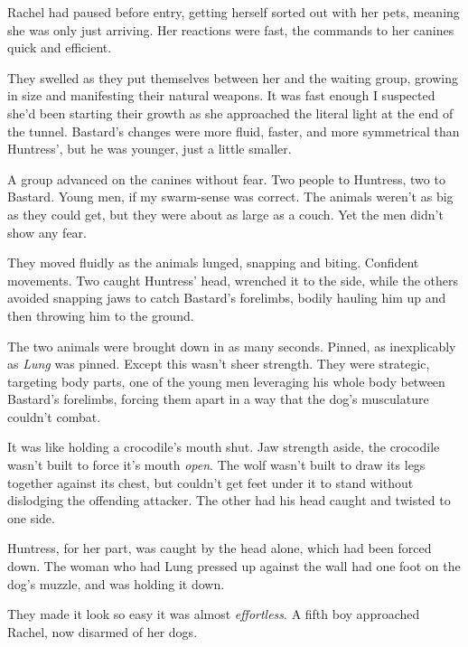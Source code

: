 Rachel had paused before entry, getting herself sorted out with her pets, meaning she was only just arriving.  Her reactions were fast, the commands to her canines quick and efficient.



They swelled as they put themselves between her and the waiting group, growing in size and manifesting their natural weapons.  It was fast enough I suspected she'd been starting their growth as she approached the literal light at the end of the tunnel.  Bastard's changes were more fluid, faster, and more symmetrical than Huntress', but he was younger, just a little smaller.



A group advanced on the canines without fear.  Two people to Huntress, two to Bastard.  Young men, if my swarm-sense was correct.  The animals weren't as big as they could get, but they were about as large as a couch.  Yet the men didn't show any fear.



They moved fluidly as the animals lunged, snapping and biting.  Confident movements.  Two caught Huntress' head, wrenched it to the side, while the others avoided snapping jaws to catch Bastard's forelimbs, bodily hauling him up and then throwing him to the ground.



The two animals were brought down in as many seconds.  Pinned, as inexplicably as \emph{Lung} was pinned.  Except this wasn't sheer strength.  They were strategic, targeting body parts, one of the young men leveraging his whole body between Bastard's forelimbs, forcing them apart in a way that the dog's musculature couldn't combat.



It was like holding a crocodile's mouth shut.  Jaw strength aside, the crocodile wasn't built to force it's mouth \emph{open}.  The wolf wasn't built to draw its legs together against its chest, but couldn't get feet under it to stand without dislodging the offending attacker.  The other had his head caught and twisted to one side.



Huntress, for her part, was caught by the head alone, which had been forced down.  The woman who had Lung pressed up against the wall had one foot on the dog's muzzle, and was holding it down.



They made it look so easy it was almost \emph{effortless}.  A fifth boy approached Rachel, now disarmed of her dogs.




